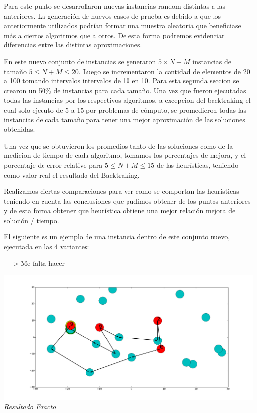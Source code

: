 Para este punto se desarrollaron nuevas instancias random distintas a las anteriores. La generación de nuevos casos de prueba es debido a que los anteriormente utilizados podrían formar una muestra aleatoria que beneficiase más a ciertos algoritmos que a otros. De esta forma podremos evidenciar diferencias entre las distintas aproximaciones.

En este nuevo conjunto de instancias se generaron $5 \times N+M$ instancias de tamaño $5 \leq N+M \leq 20$. Luego se incrementaron la cantidad de elementos de 20 a 100 tomando intervalos intervalos de 10 en 10. Para esta segunda seccion se crearon un 50$\%$ de instancias para cada tamaño.
Una vez que fueron ejecutadas todas las instancias por los respectivos algoritmos, a excepcion del backtraking el cual solo ejecuto de 5 a 15 por problemas de c\'omputo, se promedieron todas las instancias de cada tamaño para tener una mejor aproximaci\'on de las soluciones obtenidas. 

Una vez que se obtuvieron los promedios tanto de las soluciones como de la medicion de tiempo de cada algoritmo, tomamos los porcentajes de mejora, y el porcentaje de error relativo para $5 \leq N+M \leq 15$ de las heurísticas, teniendo como valor real el resultado del Backtraking.

Realizamos ciertas comparaciones para ver como se comportan las heurísticas teniendo en cuenta las conclusiones que pudimos obtener de los puntos anteriores y de esta forma obtener que heurística obtiene una mejor relación mejora de solución / tiempo.

El siguiente es un ejemplo de una instancia dentro de este conjunto nuevo, ejecutada en las 4 variantes:

  ----> Me falta hacer
    \vspace*{0.3cm} \vspace*{0.3cm}
  \begin{center}
\includegraphics[scale=0.3]{./EJ5/caminoEj3opt.png}
\\{\textit{Resultado Exacto}}
  \end{center}
  \vspace*{0.3cm}

